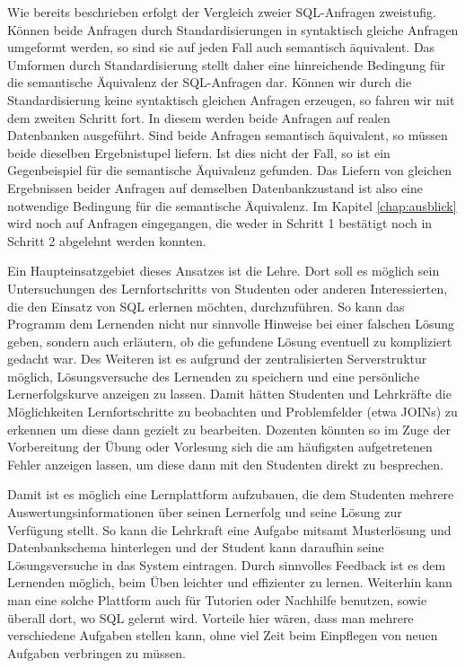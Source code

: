 Wie bereits beschrieben erfolgt der Vergleich zweier SQL-Anfragen zweistufig. Können beide Anfragen durch Standardisierungen in syntaktisch gleiche Anfragen umgeformt werden, so sind sie auf jeden Fall auch semantisch äquivalent. Das Umformen durch Standardisierung stellt daher eine hinreichende Bedingung für die semantische Äquivalenz der SQL-Anfragen dar. Können wir durch die Standardisierung keine syntaktisch gleichen Anfragen erzeugen, so fahren wir mit dem zweiten Schritt fort. In diesem werden beide Anfragen auf realen Datenbanken ausgeführt. Sind beide Anfragen semantisch äquivalent, so müssen beide dieselben Ergebnistupel liefern. Ist dies nicht der Fall, so ist ein Gegenbeispiel für die semantische Äquivalenz gefunden. Das Liefern von gleichen Ergebnissen beider Anfragen auf demselben Datenbankzustand ist also eine notwendige Bedingung für die semantische Äquivalenz. Im Kapitel \ref{chap:ausblick} wird noch auf Anfragen eingegangen, die weder in Schritt 1 bestätigt noch in Schritt 2 abgelehnt werden konnten. 


Ein Haupteinsatzgebiet dieses Ansatzes ist die Lehre. Dort soll es möglich sein Untersuchungen des Lernfortschritts von Studenten oder anderen Interessierten, die den Einsatz von SQL erlernen möchten, durchzuführen. So kann das Programm dem Lernenden nicht nur sinnvolle Hinweise bei einer falschen Lösung geben, sondern auch erläutern, ob die gefundene Lösung eventuell zu kompliziert gedacht war. Des Weiteren ist es aufgrund der zentralisierten Serverstruktur möglich, Lösungsversuche des Lernenden zu speichern und eine persönliche Lernerfolgskurve anzeigen zu lassen. Damit hätten Studenten und Lehrkräfte die Möglichkeiten Lernfortschritte zu beobachten und Problemfelder (etwa JOINs) zu erkennen um diese dann gezielt zu bearbeiten. Dozenten könnten so im Zuge der Vorbereitung der Übung oder Vorlesung sich die am häufigsten aufgetretenen Fehler anzeigen lassen, um diese dann mit den Studenten direkt zu besprechen.

Damit ist es möglich eine Lernplattform aufzubauen, die dem Studenten mehrere Auswertungsinformationen über seinen Lernerfolg und seine Lösung zur Verfügung stellt. So kann die Lehrkraft eine Aufgabe mitsamt Musterlösung und Datenbankschema hinterlegen und der Student kann daraufhin seine Lösungsversuche in das System eintragen. Durch sinnvolles Feedback ist es dem Lernenden möglich, beim Üben leichter und effizienter zu lernen. Weiterhin kann man eine solche Plattform auch für Tutorien oder Nachhilfe benutzen, sowie überall dort, wo SQL gelernt wird. Vorteile hier wären, dass man mehrere verschiedene Aufgaben stellen kann, ohne viel Zeit beim Einpflegen von neuen Aufgaben verbringen zu müssen.

